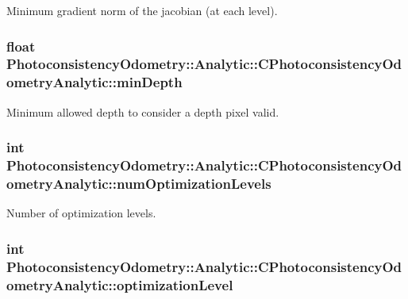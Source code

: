 \label{class_photoconsistency_odometry_1_1_analytic_1_1_c_photoconsistency_odometry_analytic_a0c34a8b704b2340114f16e98dcc33238}
Minimum gradient norm of the jacobian (at each level). \hypertarget{class_photoconsistency_odometry_1_1_analytic_1_1_c_photoconsistency_odometry_analytic_a7b34e994ff1b81ae11e3211636045171}{
\subsubsection[{minDepth}]{\setlength{\rightskip}{0pt plus 5cm}float {\bf PhotoconsistencyOdometry::Analytic::CPhotoconsistencyOdometryAnalytic::minDepth}}}
\label{class_photoconsistency_odometry_1_1_analytic_1_1_c_photoconsistency_odometry_analytic_a7b34e994ff1b81ae11e3211636045171}
Minimum allowed depth to consider a depth pixel valid. \hypertarget{class_photoconsistency_odometry_1_1_analytic_1_1_c_photoconsistency_odometry_analytic_a23743290709f60c13f55b7a9664ae30d}{
\subsubsection[{numOptimizationLevels}]{\setlength{\rightskip}{0pt plus 5cm}int {\bf PhotoconsistencyOdometry::Analytic::CPhotoconsistencyOdometryAnalytic::numOptimizationLevels}}}
\label{class_photoconsistency_odometry_1_1_analytic_1_1_c_photoconsistency_odometry_analytic_a23743290709f60c13f55b7a9664ae30d}
Number of optimization levels. \hypertarget{class_photoconsistency_odometry_1_1_analytic_1_1_c_photoconsistency_odometry_analytic_a52b80772f2fabe73161055dc84ce2687}{
\subsubsection[{optimizationLevel}]{\setlength{\rightskip}{0pt plus 5cm}int {\bf PhotoconsistencyOdometry::Analytic::CPhotoconsistencyOdometryAnalytic::optimizationLevel}}}
